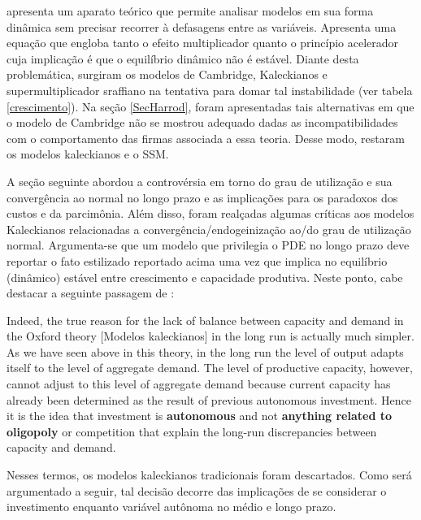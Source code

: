 
\textcite{harrod_essay_1939} apresenta um aparato teórico que permite analisar modelos em sua forma dinâmica sem precisar recorrer à defasagens entre as variáveis. Apresenta uma equação que engloba tanto o efeito multiplicador quanto o princípio acelerador cuja implicação é que o equilíbrio dinâmico não é estável. Diante desta problemática, surgiram os modelos de Cambridge, Kaleckianos e supermultiplicador sraffiano na tentativa para domar tal instabilidade (ver tabela \ref{crescimento}). Na seção \ref{SecHarrod}, foram apresentadas tais alternativas em que o modelo de Cambridge não se mostrou adequado dadas as incompatibilidades com o comportamento das firmas associada a essa teoria. Desse modo, restaram os modelos kaleckianos e o SSM. 

A seção seguinte abordou a controvérsia em torno do grau de utilização e sua convergência ao normal no longo prazo e as implicações para os paradoxos dos custos e da parcimônia. Além disso, foram realçadas algumas críticas aos modelos Kaleckianos relacionadas a convergência/endogeinização ao/do grau de utilização normal. Argumenta-se que um modelo que privilegia o PDE no longo prazo deve reportar o fato estilizado reportado acima uma vez que implica no equilíbrio (dinâmico) estável entre crescimento e capacidade produtiva. Neste ponto, cabe destacar a seguinte passagem de \textcite[p.~120, grifos nossos]{serrano_sraffian_1995}:

\begin{citacao}
Indeed, the true reason for the lack of balance between capacity and demand in the Oxford theory [Modelos kaleckianos] in the long run is actually much simpler. As we have seen above in this theory, in the long run the level of output adapts itself to the level of aggregate demand. The level of productive capacity, however, cannot adjust to this level of aggregate demand because current capacity has already been determined as the result of previous autonomous investment. Hence it is the idea that investment is \textbf{autonomous} and not \textbf{anything related to oligopoly} or competition that explain the long-run discrepancies between capacity and demand.
\end{citacao}
Nesses termos, os modelos kaleckianos tradicionais foram descartados. Como será argumentado a seguir, tal decisão decorre das implicações de se considerar o investimento enquanto variável autônoma no médio  e longo prazo.

